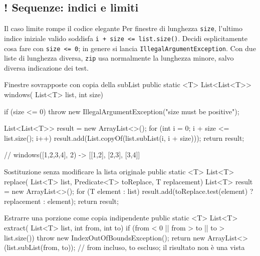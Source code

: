 ﻿\documentclass[10pt,a4paper]{article}
\newcommand{\cmd}[1]{\texttt{#1}}
\DeclareRobustCommand{\exammark}{%
  \texorpdfstring{\textcolor{examred}{\bfseries\Large !}\hspace{.18em}}{! }%
}
\newcommand{\topicsubsection}[1]{\Needspace{10\baselineskip}\subsection{#1}}
\newenvironment{topicblock}{%
  \par\medskip\noindent\begin{minipage}{\textwidth}%
}{%
  \end{minipage}\par\medskip%
}
\begin{document}
\begin{topicblock}
\topicsubsection{\exammark Sequenze: indici e limiti}
\begin{examtrap}{Il caso limite rompe il codice elegante}
Per finestre di lunghezza \cmd{size}, l'ultimo indice iniziale valido
soddisfa \cmd{i + size <= list.size()}. Decidi esplicitamente cosa fare con
\cmd{size <= 0}; in genere si lancia \cmd{IllegalArgumentException}.
Con due liste di lunghezza diversa, \cmd{zip} usa normalmente la lunghezza
minore, salvo diversa indicazione dei test.
\end{examtrap}

\begin{codebox}{Finestre sovrapposte con copia della subList}
public static <T> List<List<T>> windows(
        List<T> list,
        int size) {
    if (size <= 0) {
        throw new IllegalArgumentException("size must be positive");
    }

    List<List<T>> result = new ArrayList<>();
    for (int i = 0; i + size <= list.size(); i++) {
        result.add(List.copyOf(list.subList(i, i + size)));
    }
    return result;
}
// windows([1,2,3,4], 2) -> [[1,2], [2,3], [3,4]]
\end{codebox}

\begin{codebox}{Sostituzione senza modificare la lista originale}
public static <T> List<T> replace(
        List<T> list,
        Predicate<T> toReplace,
        T replacement) {
    List<T> result = new ArrayList<>();
    for (T element : list) {
        result.add(toReplace.test(element) ? replacement : element);
    }
    return result;
}
\end{codebox}

\begin{codebox}{Estrarre una porzione come copia indipendente}
public static <T> List<T> extract(
        List<T> list,
        int from,
        int to) {
    if (from < 0 || from > to || to > list.size()) {
        throw new IndexOutOfBoundsException();
    }
    return new ArrayList<>(list.subList(from, to));
}
// from incluso, to escluso; il risultato non è una vista
\end{codebox}
\end{topicblock}
\end{document}
